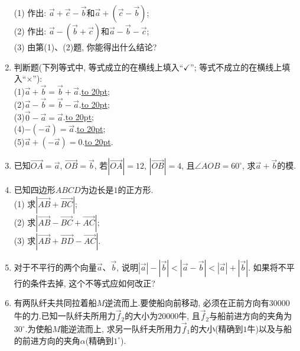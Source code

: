 \documentclass[10pt,a4paper]{article}
\newcommand{\blank}[1]{\underline{\hbox to #1pt{}}}
\begin{document}
\begin{enumerate}[1.]
\begin{center}
\end{center}
(1) 作出: $\overrightarrow a+\overrightarrow c-\overrightarrow b$和$\overrightarrow a+(\overrightarrow c-\overrightarrow b)$;\\
(2) 作出: $\overrightarrow a-(\overrightarrow b+\overrightarrow c)$和$\overrightarrow a-\overrightarrow b-\overrightarrow c$;\\
(3) 由第(1)、(2)题, 你能得出什么结论?
\item 判断题(下列等式中, 等式成立的在横线上填入``$\checkmark$''; 等式不成立的在横线上填入``$\times$''):\\
(1)$\overrightarrow a+\overrightarrow b=\overrightarrow b+\overrightarrow a$.\blank{20};\\
(2)$\overrightarrow a-\overrightarrow b=\overrightarrow b-\overrightarrow a$.\blank{20};\\
(3)$\overrightarrow 0-\overrightarrow a=\overrightarrow a$.\blank{20};\\
(4)$-(-\overrightarrow a)=\overrightarrow a$.\blank{20};\\
(5)$\overrightarrow a+(-\overrightarrow a)=0$.\blank{20}.
\item 已知$\overrightarrow{OA}=\overrightarrow a$, $\overrightarrow{OB}=\overrightarrow b$, 若$|\overrightarrow{OA}|=12$, $|\overrightarrow{OB}|=4$, 且$\angle AOB=60^{\circ }$, 求$\overrightarrow a+\overrightarrow b$的模.
\item 已知四边形$ABCD$为边长是$1$的正方形.\\
(1) 求$|\overrightarrow{AB}+\overrightarrow{BC}|$;\\
(2) 求$|\overrightarrow{AB}-\overrightarrow{BC}+\overrightarrow{AC}|$;\\
(3) 求$|\overrightarrow{AB}+\overrightarrow{BD}-\overrightarrow{AC}|$.
\item 对于不平行的两个向量$\overrightarrow a$、$\overrightarrow b$, 说明$|\overrightarrow a|-|\overrightarrow b|<|\overrightarrow a-\overrightarrow b|<|\overrightarrow a|+|\overrightarrow b|$.
如果将不平行的条件去掉, 这个不等式应如何改正?
\item 有两队纤夫共同拉着船$M$逆流而上.要使船向前移动, 必须在正前方向有$30000$牛的力.已知一队纤夫所用力$\overrightarrow f_2$的大小为$20000$牛, 且$\overrightarrow f_2$与船前进方向的夹角为$30^{\circ }$.为使船$M$能逆流而上, 求另一队纤夫所用力$\overrightarrow f_1$的大小(精确到$1$牛)以及与船的前进方向的夹角$\alpha$(精确到$1^{\circ }$).
\begin{center}
    \begin{tikzpicture}[thick,>=latex,scale = 1.5]

\end{tikzpicture}
\end{center}
\end{enumerate}
\end{document}
